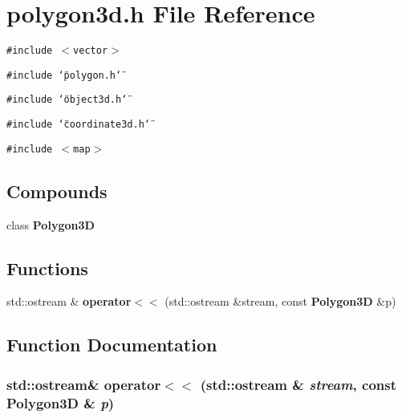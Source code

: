 \section{polygon3d.h File Reference}
\label{polygon3d_8h}
{\tt \#include $<$vector$>$}\par
{\tt \#include \char`\"{}polygon.h\char`\"{}}\par
{\tt \#include \char`\"{}object3d.h\char`\"{}}\par
{\tt \#include \char`\"{}coordinate3d.h\char`\"{}}\par
{\tt \#include $<$map$>$}\par
\subsection*{Compounds}
\begin{CompactItemize}
\item 
class {\bf Polygon3D}
\end{CompactItemize}
\subsection*{Functions}
\begin{CompactItemize}
\item 
std::ostream \& {\bf operator$<$$<$} (std::ostream \&stream, const {\bf Polygon3D} \&p)
\end{CompactItemize}


\subsection{Function Documentation}
\subsubsection{\setlength{\rightskip}{0pt plus 5cm}std::ostream\& operator$<$$<$ (std::ostream \& {\em stream}, const {\bf Polygon3D} \& {\em p})\hspace{0.3cm}{\tt  [inline]}}\label{polygon3d_8h_a0}


